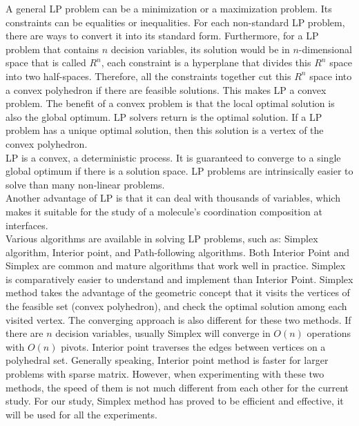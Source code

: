 A general LP problem can be a minimization or a maximization problem. Its constraints can be equalities or inequalities. For each non-standard LP problem, there are ways to convert it into its standard form. Furthermore, for a LP problem that contains $n$ decision variables, its solution would be in $n$-dimensional space that is called $R^{n}$, each constraint is a hyperplane that divides this $R^{n}$ space into two half-spaces. Therefore, all the constraints together cut this $R^{n}$ space into a convex polyhedron if there are feasible solutions. This makes LP a convex problem. The benefit of a convex problem is that the local optimal solution is also the global optimum. LP solvers return is the optimal solution. If a LP problem has a unique optimal solution, then this solution is a vertex of the convex polyhedron.\\

LP is a convex, a deterministic process. It is guaranteed to converge to a single global optimum if there is a solution space. LP problems are intrinsically easier to solve than many non-linear problems. \\

Another advantage of LP is that it can deal with thousands of variables, which makes it suitable for the study of a molecule's coordination composition at interfaces. \\

Various algorithms are available in solving LP problems, such as: Simplex algorithm, Interior point, and Path-following algorithms. Both Interior Point and Simplex are common and mature algorithms that work well in practice. Simplex is comparatively easier to understand and implement than Interior Point. Simplex method takes the advantage of the geometric concept that it visits the vertices of the feasible set (convex polyhedron), and check the optimal solution among each visited vertex. The converging approach is also different for these two methods. If there are $n$ decision variables, usually Simplex will converge in $O(n)$ operations with $O(n)$ pivots. Interior point traverses the edges between vertices on a polyhedral set. Generally speaking, Interior point method is faster for larger problems with sparse matrix. However, when experimenting with these two methods, the speed of them is not much different from each other for the current study. For our study, Simplex method has proved to be efficient and effective, it will be used for all the experiments. \\

